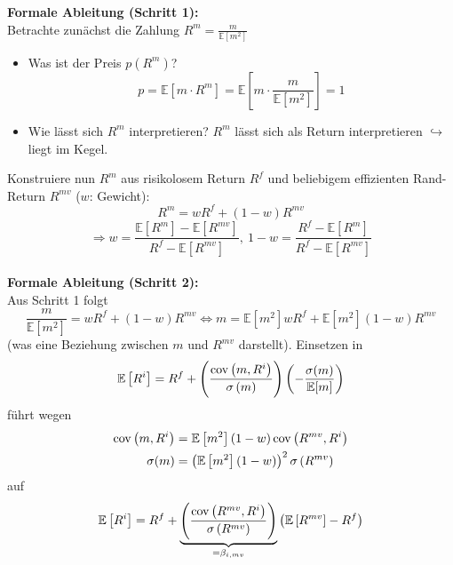 \documentclass[12pt]{extreport} %
\theoremstyle{named}
\theoremstyle{nnamed}
\theoremstyle{itshape}
\theoremstyle{normal}
\begin{document}
\textbf{Formale Ableitung (Schritt 1):} ~\\
Betrachte zunächst die Zahlung $R^m = \frac{m}{\mathbb{E}\left[ m^2 \right]}$
\begin{itemize}
	\item Was ist der Preis $p \left( R^m \right)$?
		$$ p = \mathbb{E} \left[ m \cdot R^m \right] = \mathbb{E} \left[ m \cdot \frac{m}{\mathbb{E} \left[ m^2 \right]} \right] = 1 $$
	\item Wie lässt sich $R^m$ interpretieren? $R^m$ lässt sich als Return interpretieren $\hookrightarrow$ liegt im Kegel.
\end{itemize} 
Konstruiere nun $R^m$ aus risikolosem Return $R^f$ und beliebigem effizienten Rand-Return $R^{mv}$ ($w$: Gewicht):
$$ R^m = w R^f + (1- w) R^{mv} $$
$$ \Rightarrow w = \frac{\mathbb{E} \left[ R^m \right] - \mathbb{E} \left[ R^{mv} \right]}{R^f - \mathbb{E} \left[ R^{mv} \right]}, ~ 1-w = \frac{R^f - \mathbb{E} \left[ R^{m} \right]}{R^f - \mathbb{E} \left[ R^{mv} \right]} $$
~\\
\textbf{Formale Ableitung (Schritt 2):} ~\\
Aus Schritt 1 folgt 
	$$ \frac{m}{ \mathbb{E} \left[ m^2 \right] } = w R^f +  \left( 1 - w \right) R^{mv} \iff m = \mathbb{E} \left[ m^2 \right] w R^f + \mathbb{E} \left[ m^2 \right] \left( 1 - w \right) R^{mv} $$
(was eine Beziehung zwischen $m$ und $R^{mv}$ darstellt). Einsetzen in
	$$ \mathbb{E} \left[ R^i \right] = R^f + \left( \frac{\operatorname{cov} \left(m, R^i \right)}{\sigma \left( m \right)} \right) \left( - \frac{\sigma(m)}{\mathbb{E} [m]} \right) $$
führt wegen 
\begin{align*}
	\operatorname{cov} \left( m, R^i \right) & = \mathbb{E} \left[ m^2 \right] (1 - w) \operatorname{cov} \left( R^{mv}, R^i \right) \\
	\sigma (m) & = \left( \mathbb{E} \left[ m^2 \right] \left(1 - w \right) \right)^2 \sigma \left( R^{mv} \right)
\end{align*}
auf
$$ \mathbb{E} \left[ R^i \right] = R^f + \underbrace{ \left( \frac{\operatorname{cov} \left( R^{mv}, R^i \right)}{ \sigma \left( R^{mv} \right)} \right)}_{= \beta_{i,mv}} \left( \mathbb{E}\left[ R^{mv} \right] - R^f \right) $$
\end{document}
